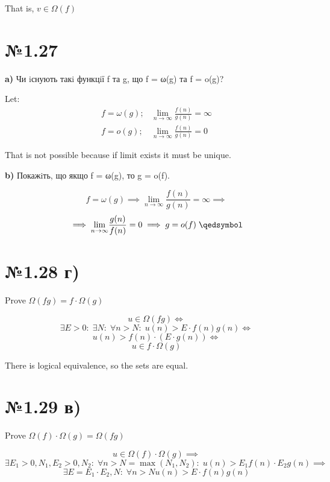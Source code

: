 \documentclass[11pt, a4paper]{article} %
\begin{document}
That is, $v\in \Omega(f)$ \qedsymbol

\section*{№1.27}
\begin{mdframed}
    \textbf{a)} Чи iснують такi функцiї f та g, що f = ω(g) та f = o(g)?
\end{mdframed}

Let:
\begin{align*}
    f = \omega(g);& \underset{n\to \infty}{\lim} \frac{f(n)}{g(n)} = \infty \\
    f = o(g);& \underset{n\to \infty}{\lim} \frac{f(n)}{g(n)} = 0
\end{align*}

That is not possible because if limit exists it must be unique.

\begin{mdframed}
    \textbf{b)} Покажiть, що якщо f = ω(g), то g = o(f).
\end{mdframed}

$$f = \omega(g) \implies \underset{n\to \infty}{\lim} \frac{f(n)}{g(n)} = \infty \implies$$
$$\implies \underset{n\to \infty}{\lim} \frac{g(n)}{f(n)} = 0 \implies g = o(f) \;\qedsymbol$$

\section*{№1.28 г)}
\begin{mdframed}
    Prove $\Omega(f g) = f \cdot \Omega(g)$
\end{mdframed}

$$u \in \Omega(fg) \iff$$
$$\exists E>0:\; \exists N:\; \forall n>N:\; u(n) > E \cdot f(n)g(n) \iff$$
$$u(n) > f(n) \cdot (E \cdot g(n)) \iff $$
$$u \in f \cdot \Omega(g)$$

There is logical equivalence, so the sets are equal. \qedsymbol

\section*{№1.29 в)}
\begin{mdframed}
    Prove $\Omega(f)\cdot\Omega(g) = \Omega(fg)$
\end{mdframed}

$$u\in \Omega(f)\cdot\Omega(g) \implies$$
$$
\exists E_1>0, N_1, E_2>0, N_2:\; \forall n>N = \max(N_1, N_2):\; u(n) > E_1 f(n)\cdot E_2 g(n) \implies
$$
$$\exists E=E_1\cdot E_2, N:\; \forall n>N u(n) > E \cdot f(n)g(n)$$
\end{document}
